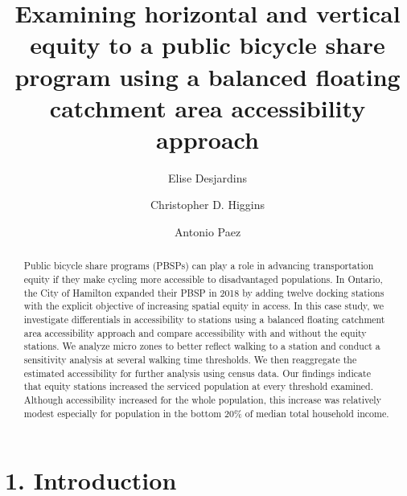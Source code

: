 \documentclass[]{elsarticle} %
\begin{document}
\begin{frontmatter}

  \title{Examining horizontal and vertical equity to a public bicycle share
program using a balanced floating catchment area accessibility approach}
    \author[McMaster University]{Elise Desjardins}
    \author[University of Toronto Scarborough]{Christopher D. Higgins}
    \author[McMaster University]{Antonio Paez}
      \address[McMaster University]{School of Earth, Environment \& Society, McMaster University, 1280 Main
Street West, Hamilton, ON L8S4L8}
    \address[University of Toronto Scarborough]{Department of Geography \& Planning, University of Toronto Scarborough,
1265 Military Trail, Toronto, ON M1C1A4}
  
  \begin{abstract}
  Public bicycle share programs (PBSPs) can play a role in advancing
  transportation equity if they make cycling more accessible to
  disadvantaged populations. In Ontario, the City of Hamilton expanded
  their PBSP in 2018 by adding twelve docking stations with the explicit
  objective of increasing spatial equity in access. In this case study, we
  investigate differentials in accessibility to stations using a balanced
  floating catchment area accessibility approach and compare accessibility
  with and without the equity stations. We analyze micro zones to better
  reflect walking to a station and conduct a sensitivity analysis at
  several walking time thresholds. We then reaggregate the estimated
  accessibility for further analysis using census data. Our findings
  indicate that equity stations increased the serviced population at every
  threshold examined. Although accessibility increased for the whole
  population, this increase was relatively modest especially for
  population in the bottom 20\% of median total household income.
  \end{abstract}
  
 \end{frontmatter}

\newpage

\hypertarget{introduction}{%
\section{1. Introduction}\label{introduction}}
\end{document}
